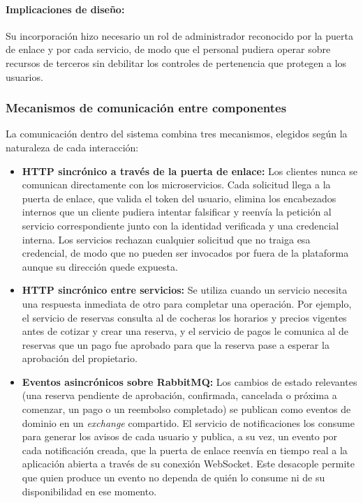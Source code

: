 \paragraph{Implicaciones de diseño:} Su incorporación hizo necesario un rol de administrador reconocido por la puerta de enlace y por cada servicio, de modo que el personal pudiera operar sobre recursos de terceros sin debilitar los controles de pertenencia que protegen a los usuarios.

\subsubsection{Mecanismos de comunicación entre componentes}

La comunicación dentro del sistema combina tres mecanismos, elegidos según la naturaleza de cada interacción:

\begin{itemize}
    \item \textbf{HTTP sincrónico a través de la puerta de enlace:} Los clientes nunca se comunican directamente con los microservicios. Cada solicitud llega a la puerta de enlace, que valida el token del usuario, elimina los encabezados internos que un cliente pudiera intentar falsificar y reenvía la petición al servicio correspondiente junto con la identidad verificada y una credencial interna. Los servicios rechazan cualquier solicitud que no traiga esa credencial, de modo que no pueden ser invocados por fuera de la plataforma aunque su dirección quede expuesta.
    \item \textbf{HTTP sincrónico entre servicios:} Se utiliza cuando un servicio necesita una respuesta inmediata de otro para completar una operación. Por ejemplo, el servicio de reservas consulta al de cocheras los horarios y precios vigentes antes de cotizar y crear una reserva, y el servicio de pagos le comunica al de reservas que un pago fue aprobado para que la reserva pase a esperar la aprobación del propietario.
    \item \textbf{Eventos asincrónicos sobre RabbitMQ:} Los cambios de estado relevantes (una reserva pendiente de aprobación, confirmada, cancelada o próxima a comenzar, un pago o un reembolso completado) se publican como eventos de dominio en un \textit{exchange} compartido. El servicio de notificaciones los consume para generar los avisos de cada usuario y publica, a su vez, un evento por cada notificación creada, que la puerta de enlace reenvía en tiempo real a la aplicación abierta a través de su conexión WebSocket. Este desacople permite que quien produce un evento no dependa de quién lo consume ni de su disponibilidad en ese momento.
\end{itemize}

